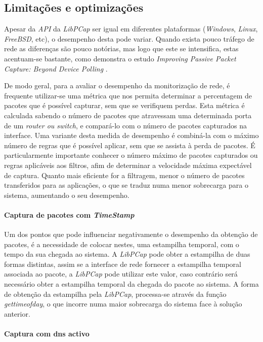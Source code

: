\subsection{Limitações e optimizações}
Apesar da \textit{API} da \textit{LibPCap} ser igual em diferentes plataformas (\textit{Windows}, \textit{Linux}, \textit{FreeBSD}, etc), o desempenho desta pode variar.
Quando exista pouco tráfego de rede as diferenças são pouco notórias, mas logo que este se intensifica, estas acentuam-se bastante, como demonstra o estudo \textit{Improving Passive Packet Capture: Beyond Device Polling} \cite{Deri2004}.

De modo geral, para a avaliar o desempenho da monitorização de rede, é frequente utilizar-se uma métrica que nos permita determinar a percentagem de pacotes que é possível capturar, sem que se verifiquem perdas.
Esta métrica é calculada sabendo o número de pacotes que atravessam uma determinada porta de um \textit{router ou switch}, e compará-lo com o número de pacotes capturados na interface.
Uma variante desta medida de desempenho é combiná-la com o máximo número de regras que é possível aplicar, sem que se assista à perda de pacotes.
É particularmente importante conhecer o número máximo de pacotes capturados ou regras aplicáveis aos filtros, afim de determinar a velocidade máxima expectável de captura.
Quanto mais eficiente for a filtragem, menor o número de pacotes transferidos para as aplicações, o que se traduz numa menor sobrecarga para o sistema, aumentando o seu desempenho.

\paragraph{Captura de pacotes com \textit{TimeStamp}}
Um dos pontos que pode influenciar negativamente o desempenho da obtenção de pacotes, é a necessidade de colocar nestes, uma estampilha temporal, com o tempo da sua chegada ao sistema.
A \textit{LibPCap} pode obter a estampilha de duas formas distintas, assim se a interface de rede fornecer a estampilha temporal associada ao pacote, a \textit{LibPCap} pode utilizar este valor, caso contrário será necessário obter a estampilha temporal da chegada do pacote ao sistema.
A forma de obtenção da estampilha pela \textit{LibPCap}, processa-se através da função \textit{gettimeofday}, o que incorre numa maior sobrecarga do sistema face à solução anterior.

\paragraph{Captura com dns activo}

